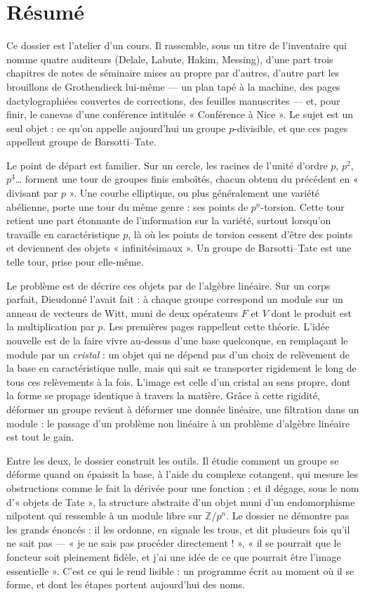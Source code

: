 \documentclass[11pt,a4paper]{article}
\begin{document}
\section*{Résumé}

\begin{resume}
Ce dossier est l'atelier d'un cours. Il rassemble, sous un titre de
l'inventaire qui nomme quatre auditeurs (Delale, Labute, Hakim, Messing),
d'une part trois chapitres de notes de séminaire mises au propre par
d'autres, d'autre part les brouillons de Grothendieck lui-même — un plan
tapé à la machine, des pages dactylographiées couvertes de corrections, des
feuilles manuscrites — et, pour finir, le canevas d'une conférence intitulée
« Conférence à Nice ». Le sujet est un seul objet : ce qu'on appelle
aujourd'hui un groupe $p$-divisible, et que ces pages appellent groupe de
Barsotti–Tate.

Le point de départ est familier. Sur un cercle, les racines de l'unité
d'ordre $p$, $p^{2}$, $p^{3}$… forment une tour de groupes finis emboîtés,
chacun obtenu du précédent en « divisant par $p$ ». Une courbe elliptique,
ou plus généralement une variété abélienne, porte une tour du même genre :
ses points de $p^{n}$-torsion. Cette tour retient une part étonnante de
l'information sur la variété, surtout lorsqu'on travaille en
caractéristique $p$, là où les points de torsion cessent d'être des points
et deviennent des objets « infinitésimaux ». Un groupe de Barsotti–Tate est
une telle tour, prise pour elle-même.

Le problème est de décrire ces objets par de l'algèbre linéaire. Sur un
corps parfait, Dieudonné l'avait fait : à chaque groupe correspond un
module sur un anneau de vecteurs de Witt, muni de deux opérateurs $F$ et
$V$ dont le produit est la multiplication par $p$. Les premières pages
rappellent cette théorie. L'idée nouvelle est de la faire vivre au-dessus
d'une base quelconque, en remplaçant le module par un \emph{cristal} : un
objet qui ne dépend pas d'un choix de relèvement de la base en
caractéristique nulle, mais qui sait se transporter rigidement le long de
tous ces relèvements à la fois. L'image est celle d'un cristal au sens
propre, dont la forme se propage identique à travers la matière. Grâce à
cette rigidité, déformer un groupe revient à déformer une donnée linéaire,
une filtration dans un module : le passage d'un problème non linéaire à un
problème d'algèbre linéaire est tout le gain.

Entre les deux, le dossier construit les outils. Il étudie comment un
groupe se déforme quand on épaissit la base, à l'aide du complexe
cotangent, qui mesure les obstructions comme le fait la dérivée pour une
fonction ; et il dégage, sous le nom d'« objets de Tate », la structure
abstraite d'un objet muni d'un endomorphisme nilpotent qui ressemble à un
module libre sur $\mathbb{Z}/p^{n}$. Le dossier ne démontre pas les
grands énoncés : il les ordonne, en signale les trous, et dit plusieurs
fois qu'il ne sait pas — « je ne sais pas procéder directement ! », « il se
pourrait que le foncteur soit pleinement fidèle, et j'ai une idée de ce que
pourrait être l'image essentielle ». C'est ce qui le rend lisible : un
programme écrit au moment où il se forme, et dont les étapes portent
aujourd'hui des noms.


\end{resume}
\end{document}
